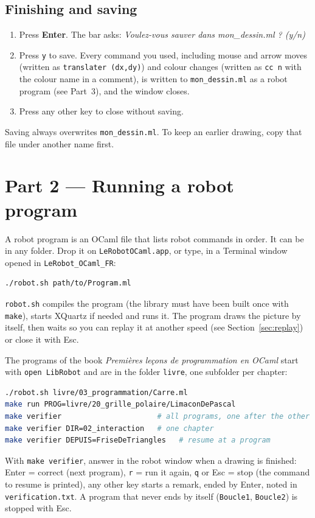 \documentclass[11pt,a4paper]{article}
\newcommand{\kbd}[1]{\texttt{#1}}
\begin{document}
\subsection{Finishing and saving}
\begin{enumerate}
\item Press \textbf{Enter}. The bar asks:
  \emph{Voulez-vous sauver dans mon\_dessin.ml ? (y/n)}
\item Press \kbd{y} to save. Every command you used, including mouse and
  arrow moves (written as \kbd{translater (dx,dy)}) and colour changes
  (written as \kbd{cc n} with the colour name in a comment), is written to
  \kbd{mon\_dessin.ml} as a robot program (see Part~3), and the window
  closes.
\item Press any other key to close without saving.
\end{enumerate}
Saving always overwrites \kbd{mon\_dessin.ml}. To keep an earlier drawing,
copy that file under another name first.

\section{Part 2 --- Running a robot program}
A robot program is an OCaml file that lists robot commands in order. It can
be in any folder. Drop it on \kbd{LeRobotOCaml.app}, or type, in a Terminal
window opened in \kbd{LeRobot\_OCaml\_FR}:
\begin{lstlisting}[language=bash]
./robot.sh path/to/Program.ml
\end{lstlisting}
\kbd{robot.sh} compiles the program (the library must have been built once
with \kbd{make}), starts XQuartz if needed and runs it. The program draws the
picture by itself, then waits so you can replay it at another speed (see
Section~\ref{sec:replay}) or close it with Esc.

The programs of the book \emph{Premi\`eres le\c{c}ons de programmation en
OCaml} start with \kbd{open LibRobot} and are in the folder \kbd{livre},
one subfolder per chapter:
\begin{lstlisting}[language=bash]
./robot.sh livre/03_programmation/Carre.ml
make run PROG=livre/20_grille_polaire/LimaconDePascal
make verifier                      # all programs, one after the other
make verifier DIR=02_interaction   # one chapter
make verifier DEPUIS=FriseDeTriangles   # resume at a program
\end{lstlisting}
With \kbd{make verifier}, answer in the robot window when a drawing is
finished: Enter = correct (next program), \kbd{r} = run it again, \kbd{q}
or Esc = stop (the command to resume is printed), any other key starts a
remark, ended by Enter, noted in \kbd{verification.txt}. A program that
never ends by itself (\kbd{Boucle1}, \kbd{Boucle2}) is stopped with Esc.
\end{document}
